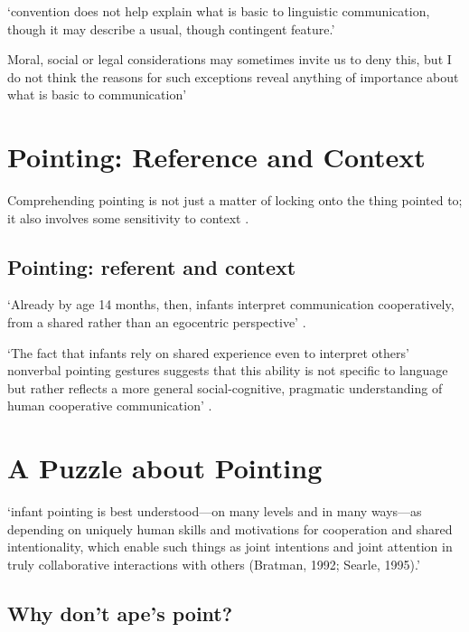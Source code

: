 \documentclass[12pt]{extarticle}
\begin{document}
\begin{multicols}{3}
‘convention does not help explain what is basic to linguistic communication, though it may describe a usual, though contingent feature.’
\citep[p.\ 280]{Davidson:1982uu}
 
Moral, social or legal considerations may sometimes invite us to deny this, but I do not think the reasons for such exceptions reveal anything of importance about what is basic to communication’
 
 
 
\section{Pointing: Reference and Context}
 
Comprehending pointing is not just a matter of locking onto the thing pointed to; it also 
involves some sensitivity to context \citep[see][]{Liebal:2010lr}.
 
\subsection{Pointing: referent and context}
 
‘Already by age 14 months, then, infants interpret communication cooperatively, from a shared rather than an egocentric perspective’ \citep[p.\ 269]{Liebal:2010lr}.
 
‘The fact that infants rely on shared experience even to interpret others’ nonverbal pointing gestures suggests that this ability is not specific to language but rather reflects a more general social-cognitive, pragmatic understanding of human cooperative communication’ \citep[p.\ 270]{Liebal:2010lr}.
 
 
 
\section{A Puzzle about Pointing}
 
‘infant pointing is best understood---on many levels and in many ways---as depending on uniquely human skills and motivations for cooperation and shared intentionality, which enable such things as joint intentions and joint attention in truly collaborative interactions with others (Bratman, 1992; Searle, 1995).’
\citep[p.\ 706]{Tomasello:2007fi}
 
\subsection{Why don’t ape’s point?}
 

\end{multicols}
\end{document}
